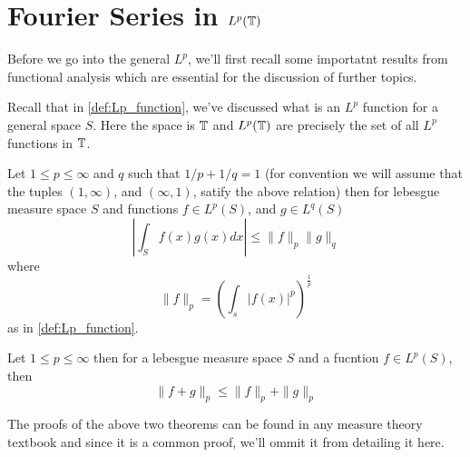 \chapter{Fourier Series in $L^p(\mathbb T)$}
Before we go into the general $L^p$, we'll first recall some importatnt results from functional analysis which are essential for the discussion of further topics.

Recall that in \autoref{def:Lp_function}, we've discussed what is an $L^p$ function for a general space $S$. Here the space is $\mathbb T$ and $L^p(\mathbb T)$ are precisely the set of all $L^p$ functions in $\mathbb T$.

\begin{theorem}
   \label{thm:Holder_inequality}
  Let $1 \le  p \le \infty$ and $q$ such that $1/p + 1/q = 1$ (for convention we will assume that the tuples $(1, \infty)$, and $(\infty, 1)$, satify the above relation) then for lebesgue measure space $S$ and functions $f \in L^p(S)$, and $g \in L^q(S)$
  $$ \left| \int_S f(x)g(x) dx \right| \le \|f\|_p \|g\|_q$$
  where $$\|f\|_p = \left(\int_s |f(x)|^p \right)^{\frac{1}{p}}$$ as in \autoref{def:Lp_function}.
\end{theorem}

\begin{theorem}
  \label{thm:Minkowski_inequality}
  Let $1 \le p \le \infty$ then for a lebesgue measure space $S$ and a fucntion $f \in L^p(S)$, then 
  $$\|f+g\|_p \le \|f\|_p + \|g\|_p$$
\end{theorem}

The proofs of the above two theorems can be found in any measure theory textbook and since it is a common proof, we'll ommit it from detailing it here.

